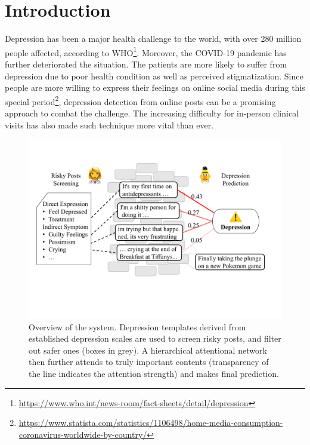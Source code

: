 
\section{Introduction}

Depression has been a major health challenge to the world, with over 280 million people affected, according to WHO\footnote{\url{https://www.who.int/news-room/fact-sheets/detail/depression}}. Moreover, the COVID-19 pandemic has further deteriorated the situation. The patients are more likely to suffer from depression due to poor health condition as well as perceived stigmatization. Since people are more willing to express their feelings on online social media during this special period\footnote{\url{https://www.statista.com/statistics/1106498/home-media-consumption-coronavirus-worldwide-by-country/}}, depression detection from online posts can be a promising approach to combat the challenge. The increasing difficulty for in-person clinical visits has also made such technique more vital than ever.

\begin{figure}[tbp]
    \centering
    \includegraphics[width=\columnwidth]{figures/overview1.pdf}
    \caption{Overview of the system. Depression templates derived from established depression scales are used to screen risky posts, and filter out safer ones (boxes in grey). A hierarchical attentional network then further attends to truly important contents (transparency of the line indicates the attention strength) and makes final prediction. }
    \label{fig:overview}
\end{figure}

